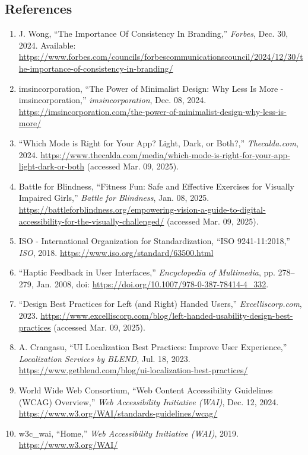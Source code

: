 \documentclass{article}
\begin{document}
\subsection{References}
\label{sub:references}
\begingroup
\color{red}
\begin{enumerate}
    \item J. Wong, “The Importance Of Consistency In Branding,” \textit{Forbes}, Dec. 30, 2024. Available: \url{https://www.forbes.com/councils/forbescommunicationscouncil/2024/12/30/the-importance-of-consistency-in-branding/}
    \item imsincorporation, “The Power of Minimalist Design: Why Less Is More - imsincorporation,” \textit{imsincorporation}, Dec. 08, 2024. \url{https://imsincorporation.com/the-power-of-minimalist-design-why-less-is-more/}
    \item “Which Mode is Right for Your App? Light, Dark, or Both?,” \textit{Thecalda.com}, 2024. \url{https://www.thecalda.com/media/which-mode-is-right-for-your-app-light-dark-or-both} (accessed Mar. 09, 2025).
    \item Battle for Blindness, “Fitness Fun: Safe and Effective Exercises for Visually Impaired Girls,” \textit{Battle for Blindness}, Jan. 08, 2025. \url{https://battleforblindness.org/empowering-vision-a-guide-to-digital-accessibility-for-the-visually-challenged/} (accessed Mar. 09, 2025).
    \item ISO - International Organization for Standardization, “ISO 9241-11:2018,” \textit{ISO}, 2018. \url{https://www.iso.org/standard/63500.html}
    \item “Haptic Feedback in User Interfaces,” \textit{Encyclopedia of Multimedia}, pp. 278–279, Jan. 2008, doi: \url{https://doi.org/10.1007/978-0-387-78414-4_332}.
    \item “Design Best Practices for Left (and Right) Handed Users,” \textit{Excelliscorp.com}, 2023. \url{https://www.excelliscorp.com/blog/left-handed-usability-design-best-practices} (accessed Mar. 09, 2025).
    \item A. Crangasu, “UI Localization Best Practices: Improve User Experience,” \textit{Localization Services by BLEND}, Jul. 18, 2023. \url{https://www.getblend.com/blog/ui-localization-best-practices/}
    \item World Wide Web Consortium, “Web Content Accessibility Guidelines (WCAG) Overview,” \textit{Web Accessibility Initiative (WAI)}, Dec. 12, 2024. \url{https://www.w3.org/WAI/standards-guidelines/wcag/}
    \item w3c\_wai, “Home,” \textit{Web Accessibility Initiative (WAI)}, 2019. \url{https://www.w3.org/WAI/}

\end{enumerate}
\end{document}
